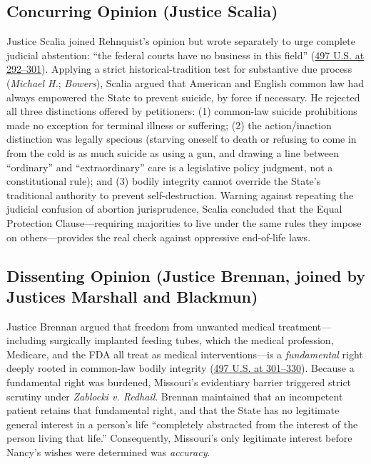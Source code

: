 \documentclass[12pt]{article}
\begin{document}
\subsection{Concurring Opinion (Justice Scalia)}

Justice Scalia joined Rehnquist's opinion but wrote separately to urge complete judicial abstention: ``the federal courts have no business in this field'' (\href{https://supreme.justia.com/cases/federal/us/497/261/}{497 U.S. at 292--301}). Applying a strict historical-tradition test for substantive due process (\textit{Michael H.}; \textit{Bowers}), Scalia argued that American and English common law had always empowered the State to prevent suicide, by force if necessary. He rejected all three distinctions offered by petitioners: (1) common-law suicide prohibitions made no exception for terminal illness or suffering; (2) the action/inaction distinction was legally specious (starving oneself to death or refusing to come in from the cold is as much suicide as using a gun, and drawing a line between ``ordinary'' and ``extraordinary'' care is a legislative policy judgment, not a constitutional rule); and (3) bodily integrity cannot override the State's traditional authority to prevent self-destruction. Warning against repeating the judicial confusion of abortion jurisprudence, Scalia concluded that the Equal Protection Clause---requiring majorities to live under the same rules they impose on others---provides the real check against oppressive end-of-life laws.

\subsection{Dissenting Opinion (Justice Brennan, joined by Justices Marshall and Blackmun)}

Justice Brennan argued that freedom from unwanted medical treatment---including surgically implanted feeding tubes, which the medical profession, Medicare, and the FDA all treat as medical interventions---is a \textit{fundamental} right deeply rooted in common-law bodily integrity (\href{https://supreme.justia.com/cases/federal/us/497/261/}{497 U.S. at 301--330}). Because a fundamental right was burdened, Missouri's evidentiary barrier triggered strict scrutiny under \textit{Zablocki v. Redhail}. Brennan maintained that an incompetent patient retains that fundamental right, and that the State has no legitimate general interest in a person's life ``completely abstracted from the interest of the person living that life.'' Consequently, Missouri's only legitimate interest before Nancy's wishes were determined was \textit{accuracy}.
\end{document}
